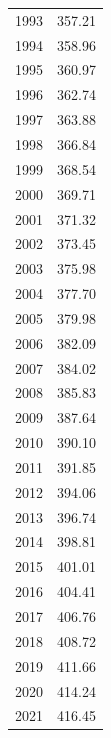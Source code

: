 \documentclass{mcmthesis}
\begin{document}
\begin{appendices}
\begin{longtable}{rr}
1993 & 357.21 \\
1994 & 358.96 \\
1995 & 360.97 \\
1996 & 362.74 \\
1997 & 363.88 \\
1998 & 366.84 \\
1999 & 368.54 \\
2000 & 369.71 \\
2001 & 371.32 \\
2002 & 373.45 \\
2003 & 375.98 \\
2004 & 377.70 \\
2005 & 379.98 \\
2006 & 382.09 \\
2007 & 384.02 \\
2008 & 385.83 \\
2009 & 387.64 \\
2010 & 390.10 \\
2011 & 391.85 \\
2012 & 394.06 \\
2013 & 396.74 \\
2014 & 398.81 \\
2015 & 401.01 \\
2016 & 404.41 \\
2017 & 406.76 \\
2018 & 408.72 \\
2019 & 411.66 \\
2020 & 414.24 \\
2021 & 416.45 \\
\bottomrule
\end{longtable}


\end{appendices}
\end{document}
